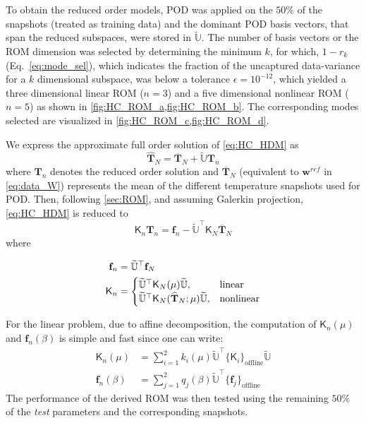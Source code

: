 \documentclass[11pt]{article}
\renewcommand{\vec}[1]{\mathbf{#1}}
\newcommand{\mat}[1]{\mathsf{#1}}
\begin{document}
To obtain the reduced order models, POD was applied on the $50\%$ of the snapshots (treated as training data) and the dominant POD basis vectors, that span the reduced subspaces, were stored in $\mathbb{\widetilde{U}}$.
The number of basis vectors or the ROM dimension was selected by determining the minimum $k$, for which,  $1-r_k$ (Eq.~\ref{eq:mode_sel}), which indicates the fraction of the uncaptured data-variance for a $k$ dimensional subspace, was below a tolerance $\epsilon = 10^{-12}$, which yielded a three dimensional linear ROM ($n=3$) and a five dimensional nonlinear ROM ($n=5$) as shown in \cref{fig:HC_ROM_a,fig:HC_ROM_b}.
The corresponding modes selected are visualized in \cref{fig:HC_ROM_c,fig:HC_ROM_d}.


We express the approximate full order solution of \cref{eq:HC_HDM} as
\begin{equation}
\widehat{\vec{T}}_N = \overline{\vec{T}}_N + \mathbb{\widetilde{U}} \vec{T}_n
\label{eq:T_rec}
\end{equation}
where $\vec{T}_n$ denotes the reduced order solution and $\overline{\vec{T}}_N$ (equivalent to $\vec{w}^{ref}$ in \cref{eq:data_W}) represents the mean of the different temperature snapshots used for POD.
Then, following \cref{sec:ROM}, and assuming Galerkin projection, \cref{eq:HC_HDM} is reduced to
\begin{equation}
\mat{K}_n\vec{T}_n = \vec{f}_n- \widetilde{\mathbb{U}}^\top \mat{K}_N\overline{\vec{T}}_N 
\label{eq:HC_ROM}
\end{equation}
where

\begin{subequations}
\centering
\begin{align}
\vec{f}_n &= \mathbb{\widetilde{U}}^\top \vec{f}_N
\label{eq:f_red} \\
\mat{K}_n &= 
\begin{cases} 
\mathbb{\widetilde{U}}^\top \mat{K}_N(\mu) \mathbb{\widetilde{U}}, & \text{linear}   \\ 
\mathbb{\widetilde{U}}^\top \mat{K}_N(\widehat{\vec{T}}_N ;\mu ) \mathbb{\widetilde{U}}, & \text{nonlinear}
\end{cases}
\label{eq:K_red}
\end{align}
\label{eq:red_qoi}
\end{subequations}

For the linear problem, due to affine decomposition, the computation of $\mat{K}_n(\mu)$ and $\vec{f}_n(\beta)$ is  simple and fast since one can write:
\begin{subequations}
\begin{align}
\mat{K}_{n}(\mu) &= \sum_{i=1}^2 k_i(\mu) \widetilde{\mathbb{U}}^\top\{\mat{K}_i\}_{\text{offline}}\widetilde{\mathbb{U}} \\
\vec{f}_{n}(\beta) &= \sum_{j=1}^2 q_j(\beta) \widetilde{\mathbb{U}}^\top\{\vec{f}_j\}_{\text{offline}}
\end{align}
\label{eq:affine_Kb_rom}
\end{subequations}
The performance of the derived ROM was then tested using the remaining $50\%$ of the \textit{test} parameters and the corresponding snapshots.
\end{document}
